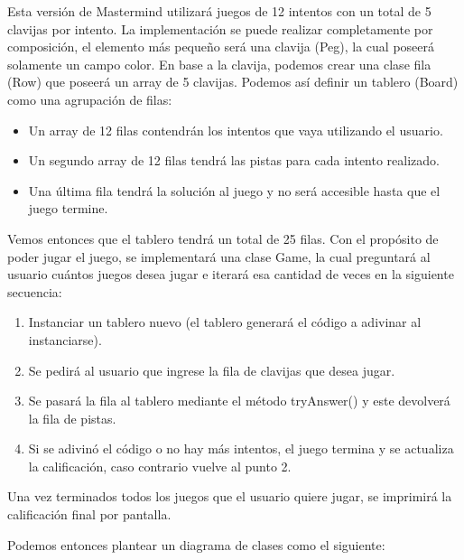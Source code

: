 \documentclass[a4paper,notitlepage]{article}
\begin{document}
Esta versión de Mastermind utilizará juegos de 12 intentos con un total de
5 clavijas por intento. La implementación se puede realizar completamente por
composición, el elemento más pequeño será una clavija (Peg), la cual poseerá
solamente un campo color. En base a la clavija, podemos crear una clase
fila (Row) que poseerá un array de 5 clavijas. Podemos así definir un tablero
(Board) como una agrupación de filas:

\begin{itemize}
    \item Un array de 12 filas contendrán los intentos que vaya utilizando el usuario.
    \item Un segundo array de 12 filas tendrá las pistas para cada intento realizado.
    \item Una última fila tendrá la solución al juego y no será accesible hasta que el juego termine.
\end{itemize}

Vemos entonces que el tablero tendrá un total de 25 filas. Con el propósito de
poder jugar el juego, se implementará una clase Game, la cual preguntará al
usuario cuántos juegos desea jugar e iterará esa cantidad de veces en la
siguiente secuencia:

\begin{enumerate}
    \item Instanciar un tablero nuevo (el tablero generará el código a adivinar al instanciarse).
    \item Se pedirá al usuario que ingrese la fila de clavijas que desea jugar.
    \item Se pasará la fila al tablero mediante el método tryAnswer() y este devolverá la fila de pistas.
    \item Si se adivinó el código o no hay más intentos, el juego termina y se actualiza la calificación, caso contrario vuelve al punto 2.
\end{enumerate}

Una vez terminados todos los juegos que el usuario quiere jugar, se imprimirá
la calificación final por pantalla.

\pagebreak
Podemos entonces plantear un diagrama de clases como el siguiente:

\begin{figure}[H]
    \centering
    \scalebox{.6}{
        
    }
\end{figure}
\end{document}
